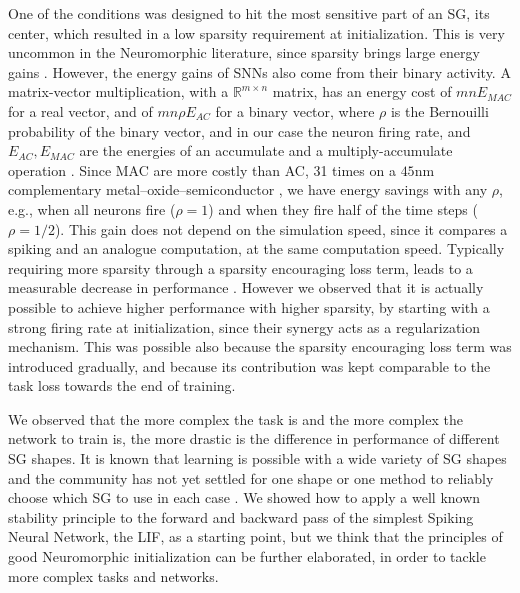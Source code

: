 One of the conditions was designed to hit the most sensitive part of an SG, its center, which resulted in a low sparsity requirement at initialization. This is very uncommon in the Neuromorphic literature, since sparsity brings large energy gains \cite{henderson2020towards,blouw2019benchmarking, 9395703,taulsnn, rossbroich2022fluctuation}.
However, the energy gains of SNNs also come from their binary activity. A matrix-vector multiplication, with a $\mathbb{R}^{m\times n}$ matrix, has an energy cost of $mnE_{MAC}$ for a real vector, and of $mn\rho E_{AC}$ for a binary vector, where $\rho$ is the Bernouilli probability of the binary vector, and in our case the neuron firing rate, and $E_{AC}, E_{MAC}$ are the energies of an accumulate and a multiply-accumulate operation \cite{yin2021accurate, hunger2005floating}. Since MAC are more costly than AC, 31 times on a $45$nm complementary metal–oxide–semiconductor \cite{yin2021accurate, horowitz20141}, we have energy savings with any $\rho$, e.g., when all neurons fire ($\rho=1$) and when they fire half of the time steps ($\rho=1/2$). This gain does not depend on the simulation speed, since it compares a spiking and an analogue computation, at the same computation speed.
Typically requiring more sparsity through a sparsity encouraging loss term, leads to a measurable decrease in performance \cite{zenke2021remarkable, rossbroich2022fluctuation}. However we observed that it is actually possible to achieve higher performance with higher sparsity, by starting with a strong firing rate at initialization, since their synergy acts as a regularization mechanism. This was possible also because the sparsity encouraging loss term was introduced gradually, and because its contribution was kept comparable to the task loss towards the end of training.

We observed that the more complex the task is and the more complex the network to train is, the more drastic is the difference in performance of different SG shapes. It is known that learning is possible with a wide variety of SG shapes \cite{zenke2021remarkable} and the community has not yet settled for one shape or one method to reliably choose which SG to use in each case \cite{surrogate2019}. We showed how to apply a well known stability principle to the forward and backward pass of the simplest Spiking Neural Network, the LIF, as a starting point, but we think that the principles of good Neuromorphic initialization can be further elaborated, in order to tackle more complex tasks and networks.


